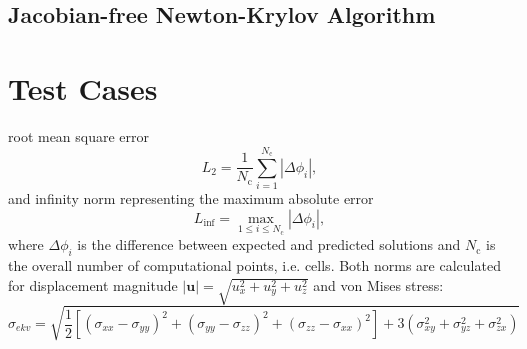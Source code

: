 \documentclass[sn-mathphys,Numbered]{sn-jnl}%
\begin{document}
%
\subsection{Jacobian-free Newton-Krylov Algorithm}
\label{sec:vol_int}
%


%
%        
\section{Test Cases}
\label{sec:test_cases}
%
%
%

root mean square error
\begin{equation}
L_2 = \frac{1}{N_{\text{c}}}\sum_{i=1}^{N_{\text{c}}} |\Delta \phi_i|,
\end{equation}
and infinity norm representing the maximum absolute error
\begin{equation}
L_{\inf} = \max_{1 \leq i \leq N_{\text{c}}} |\Delta \phi_i|,
\end{equation}
where $\Delta \phi_i$ is the difference between expected and predicted solutions and $N_{\text{c}}$ is the overall number of computational points, i.e. cells.
Both norms are calculated for displacement magnitude $|\boldsymbol{u}|=\sqrt{u_x^2+u_y^2+u_z^2}$ and von Mises stress:
\begin{equation}
\sigma_{ekv}=\sqrt{\frac{1}{2}\left[  (\sigma_{xx}-\sigma_{yy})^2+(\sigma_{yy}-\sigma_{zz})^2+(\sigma_{zz}-\sigma_{xx})^2 \right]+3\left(\sigma_{xy}^2+\sigma_{yz}^2+\sigma_{zx}^2\right)}
\end{equation}
%
\end{document}

